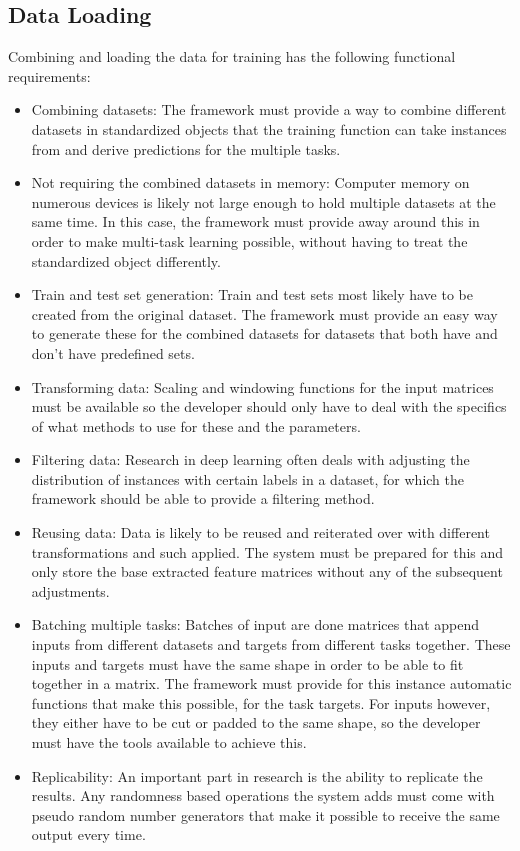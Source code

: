 \subsection{Data Loading}

Combining and loading the data for training has the following functional requirements:

\begin{itemize}
	\item Combining datasets: The framework must provide a way to combine different datasets in standardized objects that the training function can take instances from and derive predictions for the multiple tasks.
	\item Not requiring the combined datasets in memory: Computer memory on numerous devices is likely not large enough to hold multiple datasets at the same time. In this case, the framework must provide away around this in order to make multi-task learning possible, without having to treat the standardized object differently.
	\item Train and test set generation: Train and test sets most likely have to be created from the original dataset. The framework must provide an easy way to generate these for the combined datasets for datasets that both have and don't have predefined sets.
	\item Transforming data: Scaling and windowing functions for the input matrices must be available so the developer should only have to deal with the specifics of what methods to use for these and the parameters. 
	\item Filtering data: Research in deep learning often deals with adjusting the distribution of instances with certain labels in a dataset, for which the framework should be able to provide a filtering method.
	\item Reusing data: Data is likely to be reused and reiterated over with different transformations and such applied. The system must be prepared for this and only store the base extracted feature matrices without any of the subsequent adjustments.
	\item Batching multiple tasks: Batches of input are done matrices that append inputs from different datasets and targets from different tasks together. These inputs and targets must have the same shape in order to be able to fit together in a matrix. The framework must provide for this instance automatic functions that make this possible, for the task targets. For inputs however, they either have to be cut or padded to the same shape, so the developer must have the tools available to achieve this.
	\item Replicability: An important part in research is the ability to replicate the results. Any randomness based operations the system adds must come with pseudo random number generators that make it possible to receive the same output every time.
\end{itemize}

